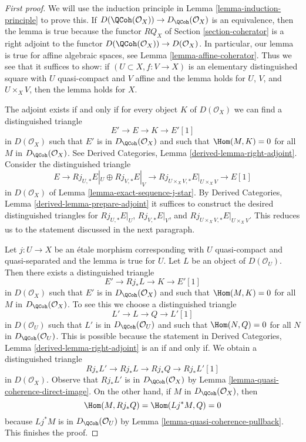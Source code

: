 \begin{proof}[First proof]
We will use the induction principle in
Lemma \ref{lemma-induction-principle}
to prove this. If $D(\QCoh(\mathcal{O}_X)) \to D_\QCoh(\mathcal{O}_X)$
is an equivalence, then the lemma is true because the functor
$RQ_X$ of Section \ref{section-coherator} is a right adjoint to the functor
$D(\QCoh(\mathcal{O}_X)) \to D(\mathcal{O}_X)$.
In particular, our lemma is true for affine algebraic spaces, see
Lemma \ref{lemma-affine-coherator}.
Thus we see that it suffices to show: if $(U \subset X, f : V \to X)$
is an elementary distinguished square with $U$ quasi-compact
and $V$ affine and the lemma holds for $U$, $V$, and $U \times_X V$,
then the lemma holds for $X$.

\medskip\noindent
The adjoint exists if and only if for every object $K$ of
$D(\mathcal{O}_X)$ we can find a distinguished triangle
$$
E' \to E \to K \to E'[1]
$$
in $D(\mathcal{O}_X)$
such that $E'$ is in $D_\QCoh(\mathcal{O}_X)$ and such that
$\Hom(M, K) = 0$ for all $M$ in $D_\QCoh(\mathcal{O}_X)$. See
Derived Categories, Lemma \ref{derived-lemma-right-adjoint}.
Consider the distinguished triangle
$$
E \to Rj_{U, *}E|_U \oplus Rj_{V, *}E|_V \to
Rj_{U \times_X V, *}E|_{U \times_X V} \to E[1]
$$
in $D(\mathcal{O}_X)$ of Lemma \ref{lemma-exact-sequence-j-star}.
By Derived Categories, Lemma \ref{derived-lemma-prepare-adjoint}
it suffices to construct the desired distinguished triangles
for $Rj_{U, *}E|_U$, $Rj_{V, *}E|_V$, and
$Rj_{U \times_X V, *}E|_{U \times_X V}$. This reduces us to the statement
discussed in the next paragraph.

\medskip\noindent
Let $j : U \to X$ be an \'etale morphism corresponding with
$U$ quasi-compact and quasi-separated and the lemma is true for $U$.
Let $L$ be an object of $D(\mathcal{O}_U)$.
Then there exists a distinguished triangle
$$
E' \to Rj_*L \to K \to E'[1]
$$
in $D(\mathcal{O}_X)$
such that $E'$ is in $D_\QCoh(\mathcal{O}_X)$ and such that
$\Hom(M, K) = 0$ for all $M$ in $D_\QCoh(\mathcal{O}_X)$.
To see this we choose a distinguished triangle
$$
L' \to L \to Q \to L'[1]
$$
in $D(\mathcal{O}_U)$ such that $L'$ is in $D_\QCoh(\mathcal{O}_U)$
and such that $\Hom(N, Q) = 0$ for all $N$ in $D_\QCoh(\mathcal{O}_U)$.
This is possible because the statement in
Derived Categories, Lemma \ref{derived-lemma-right-adjoint}
is an if and only if.
We obtain a distinguished triangle
$$
Rj_*L' \to Rj_*L \to Rj_*Q \to Rj_*L'[1]
$$
in $D(\mathcal{O}_X)$. Observe that $Rj_*L'$ is in $D_\QCoh(\mathcal{O}_X)$
by Lemma \ref{lemma-quasi-coherence-direct-image}.
On the other hand, if $M$ in $D_\QCoh(\mathcal{O}_X)$, then
$$
\Hom(M, Rj_*Q) = \Hom(Lj^*M, Q) = 0
$$
because $Lj^*M$ is in $D_\QCoh(\mathcal{O}_U)$ by
Lemma \ref{lemma-quasi-coherence-pullback}.
This finishes the proof.
\end{proof}

